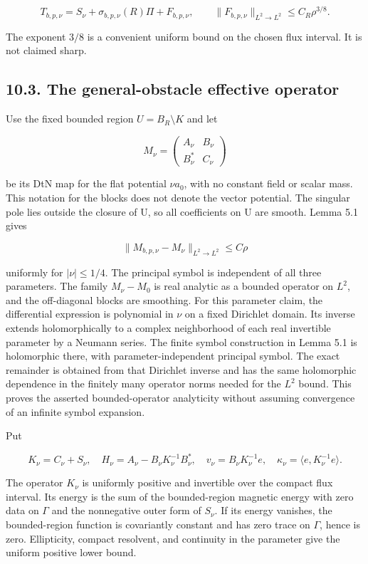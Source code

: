 \documentclass[11pt]{article}
\begin{document}
\[T_{b,p,\nu}=S_\nu+\sigma_{b,p,\nu}(R)\Pi+F_{b,p,\nu},\qquad
\|F_{b,p,\nu}\|_{L^2\to L^2}\leq C_R\rho^{3/8}.\tag{F12}\]

The exponent \(3/8\) is a convenient uniform bound on the chosen flux
interval. It is not claimed sharp.

\subsection{10.3. The general-obstacle effective
operator}\label{the-general-obstacle-effective-operator}

Use the fixed bounded region \(U=B_R\setminus K\) and let

\[M_\nu=\begin{pmatrix}A_\nu&B_\nu\\B_\nu^*&C_\nu\end{pmatrix}\]

be its DtN map for the flat potential \(\nu a_0\), with no constant
field or scalar mass. This notation for the blocks does not denote the
vector potential. The singular pole lies outside the closure of U, so
all coefficients on U are smooth. Lemma 5.1 gives

\[\|M_{b,p,\nu}-M_\nu\|_{L^2\to L^2}\leq C\rho\tag{F13}\]

uniformly for \(|\nu|\leq1/4\). The principal symbol is independent of
all three parameters. The family \(M_\nu-M_0\) is real analytic as a
bounded operator on \(L^2\), and the off-diagonal blocks are smoothing.
For this parameter claim, the differential expression is polynomial in
\(\nu\) on a fixed Dirichlet domain. Its inverse extends holomorphically
to a complex neighborhood of each real invertible parameter by a Neumann
series. The finite symbol construction in Lemma 5.1 is holomorphic
there, with parameter-independent principal symbol. The exact remainder
is obtained from that Dirichlet inverse and has the same holomorphic
dependence in the finitely many operator norms needed for the \(L^2\)
bound. This proves the asserted bounded-operator analyticity without
assuming convergence of an infinite symbol expansion.

Put

\[K_\nu=C_\nu+S_\nu,\quad
H_\nu=A_\nu-B_\nu K_\nu^{-1}B_\nu^*,\quad
v_\nu=B_\nu K_\nu^{-1}e,\quad
\kappa_\nu=\langle e,K_\nu^{-1}e\rangle.\]

The operator \(K_\nu\) is uniformly positive and invertible over the
compact flux interval. Its energy is the sum of the bounded-region
magnetic energy with zero data on \(\Gamma\) and the nonnegative outer
form of \(S_\nu\). If its energy vanishes, the bounded-region function
is covariantly constant and has zero trace on \(\Gamma\), hence is zero.
Ellipticity, compact resolvent, and continuity in the parameter give the
uniform positive lower bound.
\end{document}
